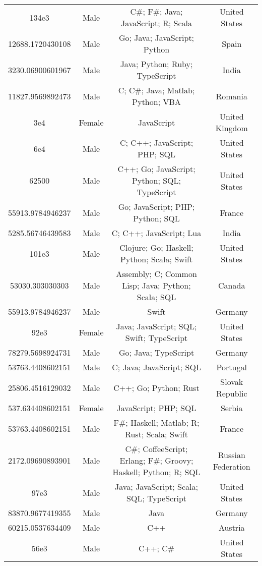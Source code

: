 \begin{center}
\begin{tabular}{ |c|c|c|c| }
134e3  &  Male  &  C\#; F\#; Java; JavaScript; R; Scala  &  United States  \\ 
12688.1720430108  &  Male  &  Go; Java; JavaScript; Python  &  Spain  \\ 
3230.06900601967  &  Male  &  Java; Python; Ruby; TypeScript  &  India  \\ 
11827.9569892473  &  Male  &  C; C\#; Java; Matlab; Python; VBA  &  Romania  \\ 
3e4  &  Female  &  JavaScript  &  United Kingdom  \\ 
6e4  &  Male  &  C; C++; JavaScript; PHP; SQL  &  United States  \\ 
62500  &  Male  &  C++; Go; JavaScript; Python; SQL; TypeScript  &  United States  \\ 
55913.9784946237  &  Male  &  Go; JavaScript; PHP; Python; SQL  &  France  \\ 
5285.56746439583  &  Male  &  C; C++; JavaScript; Lua  &  India  \\ 
101e3  &  Male  &  Clojure; Go; Haskell; Python; Scala; Swift  &  United States  \\ 
53030.303030303  &  Male  &  Assembly; C; Common Lisp; Java; Python; Scala; SQL  &  Canada  \\ 
55913.9784946237  &  Male  &  Swift  &  Germany  \\ 
92e3  &  Female  &  Java; JavaScript; SQL; Swift; TypeScript  &  United States  \\ 
78279.5698924731  &  Male  &  Go; Java; TypeScript  &  Germany  \\ 
53763.4408602151  &  Male  &  C; Java; JavaScript; SQL  &  Portugal  \\ 
25806.4516129032  &  Male  &  C++; Go; Python; Rust  &  Slovak Republic  \\ 
537.634408602151  &  Female  &  JavaScript; PHP; SQL  &  Serbia  \\ 
53763.4408602151  &  Male  &  F\#; Haskell; Matlab; R; Rust; Scala; Swift  &  France  \\ 
2172.09690893901  &  Male  &  C\#; CoffeeScript; Erlang; F\#; Groovy; Haskell; Python; R; SQL  &  Russian Federation  \\ 
97e3  &  Male  &  Java; JavaScript; Scala; SQL; TypeScript  &  United States  \\ 
83870.9677419355  &  Male  &  Java  &  Germany  \\ 
60215.0537634409  &  Male  &  C++  &  Austria  \\ 
56e3  &  Male  &  C++; C\#  &  United States  \\ 

\end{tabular}
\end{center}
